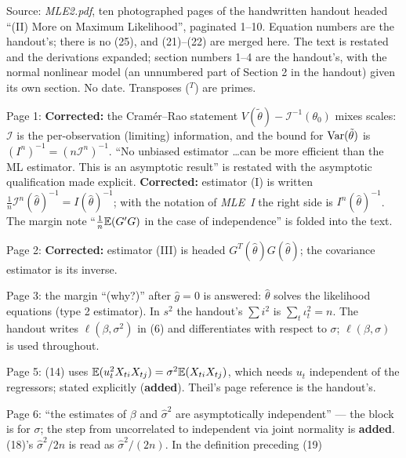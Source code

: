 \documentclass[11pt]{article}
\begin{document}
\clearpage
\begin{transcriptnotes}
 \item Source: \emph{MLE2.pdf}, ten photographed pages of the handwritten handout headed
       ``(II) More on Maximum Likelihood'', paginated 1--10. Equation numbers are the
       handout's; there is no (25), and (21)--(22) are merged here. The text is restated and
       the derivations expanded; section numbers 1--4 are the handout's, with the normal
       nonlinear model (an unnumbered part of Section 2 in the handout) given its own section.
       No date. Transposes ($^{T}$) are primes.
 \item Page 1: \textbf{Corrected:} the Cram\'er--Rao statement $V(\tilde\theta)-\mathcal I^{-1}(\theta_{0})$ mixes scales:
       $\mathcal I$ is the per-observation (limiting) information, and the bound for $\operatorname{Var}(\tilde\theta)$ is
       $(I^{n})^{-1}=(n\mathcal I^{n})^{-1}$. ``No unbiased estimator \ldots can be more efficient than the
       ML estimator. This is an asymptotic result'' is restated with the asymptotic
       qualification made explicit. \textbf{Corrected:} estimator (I) is written
       $\frac1n\mathcal I^{n}(\hat\theta)^{-1}=I(\hat\theta)^{-1}$; with the notation of \emph{MLE~I} the right side is
       $I^{n}(\hat\theta)^{-1}$. The margin note ``$\frac1n\mathbb{E}(G'G)$ in the case of independence'' is
       folded into the text.
 \item Page 2: \textbf{Corrected:} estimator (III) is headed $G^{T}(\hat\theta)G(\hat\theta)$; the covariance
       estimator is its inverse.
 \item Page 3: the margin ``(why?)'' after $\hat g=0$ is answered: $\hat\theta$ solves the likelihood
       equations (type 2 estimator). In $s^{2}$ the handout's $\sum i^{2}$ is $\sum_{t}\iota_{t}^{2}=n$. The handout
       writes $\ell(\beta,\sigma^{2})$ in (6) and differentiates with respect to $\sigma$; $\ell(\beta,\sigma)$ is used
       throughout.
 \item Page 5: (14) uses $\mathbb{E}(u_{t}^{2}X_{ti}X_{tj})=\sigma^{2}\mathbb{E}(X_{ti}X_{tj})$, which needs $u_{t}$ independent of the
       regressors; stated explicitly (\textbf{added}). Theil's page reference is the handout's.
 \item Page 6: ``the estimates of $\beta$ and $\hat\sigma^{2}$ are asymptotically independent'' --- the block
       is for $\sigma$; the step from uncorrelated to independent via joint normality is
       \textbf{added}. (18)'s $\hat\sigma^{2}/2n$ is read as $\hat\sigma^{2}/(2n)$. In the definition preceding (19)

\end{transcriptnotes}
\end{document}
